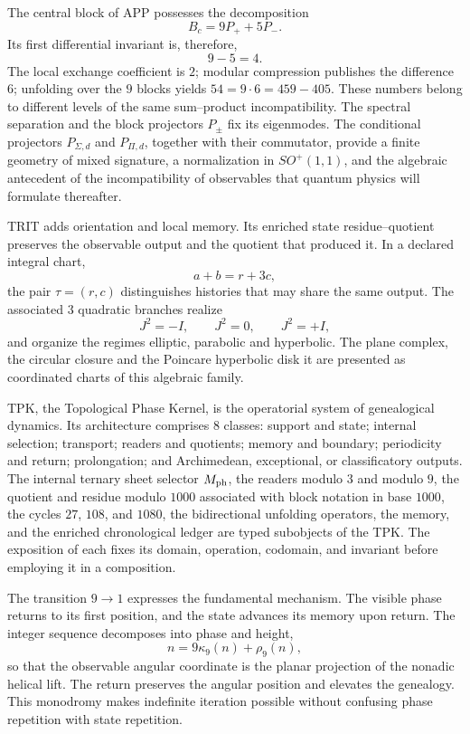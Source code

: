 The central block of APP possesses the decomposition
\[
 B_c=9P_++5P_-.
\]
Its first differential invariant is, therefore,
\[
 \boxed{9-5=4}.
\]
The local exchange coefficient is \(2\); modular compression publishes
the difference \(6\); unfolding over the \(9\) blocks yields
\(54=9\cdot6=459-405\). These numbers belong to different levels of the same
sum--product incompatibility. The spectral separation and the block
projectors \(P_\pm\) fix its eigenmodes. The conditional projectors
\(P_{\Sigma,d}\) and \(P_{\Pi,d}\), together with their commutator,
provide a finite geometry of mixed signature,
a normalization in \(SO^+(1,1)\), and the algebraic antecedent of the
incompatibility of observables that quantum physics will formulate thereafter.

TRIT adds orientation and local memory. Its enriched state
residue--quotient preserves the observable output and the quotient that produced it.
In a declared integral chart,
\[
 a+b=r+3c,
\]
the pair \(\widehat\tau=(r,c)\) distinguishes histories that may share the
same output. The associated \(3\) quadratic branches realize
\[
 J^2=-I,\qquad J^2=0,\qquad J^2=+I,
\]
and organize the regimes elliptic, parabolic and hyperbolic. The plane
complex, the circular closure and the Poincare hyperbolic disk it are presented
as coordinated charts of this algebraic family.

TPK, the Topological Phase Kernel, is the operatorial system of genealogical dynamics. Its architecture comprises \(8\) classes: support and state; internal selection; transport; readers and quotients; memory and boundary; periodicity and return; prolongation; and Archimedean, exceptional, or classificatory outputs. The internal ternary sheet selector \(M_{\rm ph}\), the readers modulo \(3\) and modulo \(9\), the quotient and residue modulo \(1000\) associated with block notation in base \(1000\), the cycles \(27\), \(108\), and \(1080\), the bidirectional unfolding operators, the memory, and the enriched chronological ledger are typed subobjects of the TPK. The exposition of each fixes its domain, operation, codomain, and invariant before employing it in a composition.

The transition \(9\to1\) expresses the fundamental mechanism. The visible phase
returns to its first position, and the state advances its memory upon return.
The integer sequence decomposes into phase and height,
\[
 n=9\kappa_9(n)+\rho_9(n),
\]
so that the observable angular coordinate is the planar projection of the
nonadic helical lift. The
return preserves the angular position and elevates the genealogy. This monodromy
makes indefinite iteration possible without confusing phase repetition with
state repetition.

